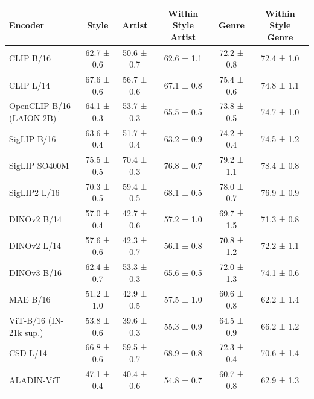 \begin{tabular}{lccccc}
\toprule
Encoder & Style & Artist & Within Style Artist & Genre & Within Style Genre \\
\midrule
CLIP B/16 & 62.7 ± 0.6 & 50.6 ± 0.7 & 62.6 ± 1.1 & 72.2 ± 0.8 & 72.4 ± 1.0 \\
CLIP L/14 & 67.6 ± 0.6 & 56.7 ± 0.6 & 67.1 ± 0.8 & 75.4 ± 0.6 & 74.8 ± 1.1 \\
OpenCLIP B/16 (LAION-2B) & 64.1 ± 0.3 & 53.7 ± 0.3 & 65.5 ± 0.5 & 73.8 ± 0.5 & 74.7 ± 1.0 \\
SigLIP B/16 & 63.6 ± 0.4 & 51.7 ± 0.4 & 63.2 ± 0.9 & 74.2 ± 0.4 & 74.5 ± 1.2 \\
SigLIP SO400M & 75.5 ± 0.5 & 70.4 ± 0.3 & 76.8 ± 0.7 & 79.2 ± 1.1 & 78.4 ± 0.8 \\
SigLIP2 L/16 & 70.3 ± 0.5 & 59.4 ± 0.5 & 68.1 ± 0.5 & 78.0 ± 0.7 & 76.9 ± 0.9 \\
DINOv2 B/14 & 57.0 ± 0.4 & 42.7 ± 0.6 & 57.2 ± 1.0 & 69.7 ± 1.5 & 71.3 ± 0.8 \\
DINOv2 L/14 & 57.6 ± 0.6 & 42.3 ± 0.7 & 56.1 ± 0.8 & 70.8 ± 1.2 & 72.2 ± 1.1 \\
DINOv3 B/16 & 62.4 ± 0.7 & 53.3 ± 0.3 & 65.6 ± 0.5 & 72.0 ± 1.3 & 74.1 ± 0.6 \\
MAE B/16 & 51.2 ± 1.0 & 42.9 ± 0.5 & 57.5 ± 1.0 & 60.6 ± 0.8 & 62.2 ± 1.4 \\
ViT-B/16 (IN-21k sup.) & 53.8 ± 0.6 & 39.6 ± 0.3 & 55.3 ± 0.9 & 64.5 ± 0.9 & 66.2 ± 1.2 \\
CSD L/14 & 66.8 ± 0.6 & 59.5 ± 0.7 & 68.9 ± 0.8 & 72.3 ± 0.4 & 70.6 ± 1.4 \\
ALADIN-ViT & 47.1 ± 0.4 & 40.4 ± 0.6 & 54.8 ± 0.7 & 60.7 ± 0.8 & 62.9 ± 1.3 \\
\bottomrule
\end{tabular}
